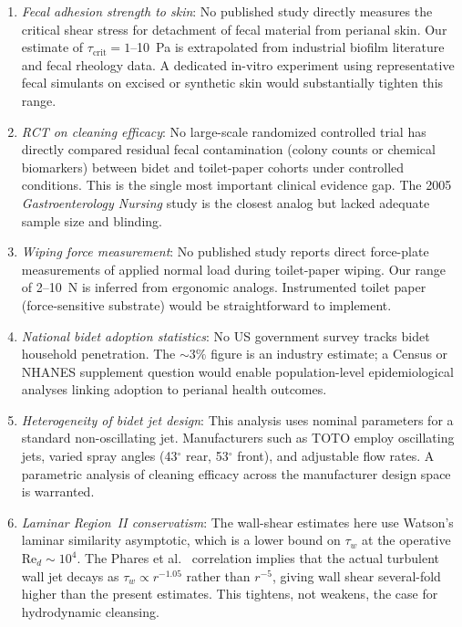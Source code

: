 \documentclass[aps,prfluids,reprint,amsmath,amssymb,floatfix]{revtex4-2}
\newcommand{\Rey}{\mathrm{Re}}
\begin{document}
\begin{enumerate}[leftmargin=*, label=(\roman*)]
    \item \emph{Fecal adhesion strength to skin}: No published study directly
    measures the critical shear stress for detachment of fecal material from
    perianal skin. Our estimate of $\tau_\mathrm{crit} = 1$--\SI{10}{Pa} is
    extrapolated from industrial biofilm literature and fecal rheology data.
    A dedicated in-vitro experiment using representative fecal simulants on
    excised or synthetic skin would substantially tighten this range.
    \item \emph{RCT on cleaning efficacy}: No large-scale randomized
    controlled trial has directly compared residual fecal contamination
    (colony counts or chemical biomarkers) between bidet and toilet-paper
    cohorts under controlled conditions. This is the single most important
    clinical evidence gap. The 2005 \textit{Gastroenterology Nursing} study
    is the closest analog but lacked adequate sample size and blinding.
    \item \emph{Wiping force measurement}: No published study reports direct
    force-plate measurements of applied normal load during toilet-paper wiping.
    Our range of 2--\SI{10}{N} is inferred from ergonomic analogs. Instrumented
    toilet paper (force-sensitive substrate) would be straightforward to
    implement.
    \item \emph{National bidet adoption statistics}: No US government survey
    tracks bidet household penetration. The $\sim3\%$ figure is an industry
    estimate; a Census or NHANES supplement question would enable population-level
    epidemiological analyses linking adoption to perianal health outcomes.
    \item \emph{Heterogeneity of bidet jet design}: This analysis uses
    nominal parameters for a standard non-oscillating jet. Manufacturers
    such as TOTO employ oscillating jets, varied spray angles (43$^\circ$ rear,
    53$^\circ$ front), and adjustable flow rates. A parametric analysis of
    cleaning efficacy across the manufacturer design space is warranted.
    \item \emph{Laminar Region~II conservatism}: The wall-shear
    estimates here use Watson's laminar similarity asymptotic, which
    is a lower bound on $\tau_w$ at the operative
    $\Rey_d \sim 10^4$. The Phares et al.~\citep{Phares2000}
    correlation implies that the actual turbulent wall jet decays as
    $\tau_w \propto r^{-1.05}$ rather than $r^{-5}$, giving wall
    shear several-fold higher than the present estimates. This
    tightens, not weakens, the case for hydrodynamic cleansing.
\end{enumerate}
\end{document}
